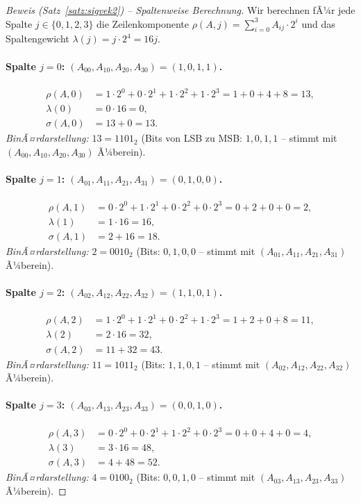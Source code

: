 ﻿\documentclass[a4paper,12pt]{scrreprt}
\theoremstyle{definition}
\begin{document}
\begin{proof}[Beweis (Satz~\ref{satz:sigvek2}) -- Spaltenweise Berechnung]
Wir berechnen fÃ¼r jede Spalte $j \in \{0,1,2,3\}$ die Zeilenkomponente $\rho(A,j) = \sum_{i=0}^{3} A_{ij} \cdot 2^i$ und das Spaltengewicht $\lambda(j) = j \cdot 2^4 = 16j$.

\paragraph{Spalte $j=0$: $(A_{00}, A_{10}, A_{20}, A_{30}) = (1, 0, 1, 1)$.}
\begin{align*}
\rho(A,0) &= 1 \cdot 2^0 + 0 \cdot 2^1 + 1 \cdot 2^2 + 1 \cdot 2^3 = 1 + 0 + 4 + 8 = 13, \\
\lambda(0) &= 0 \cdot 16 = 0, \\
\sigma(A,0) &= 13 + 0 = 13.
\end{align*}
\emph{BinÃ¤rdarstellung:} $13 = 1101_2$ (Bits von LSB zu MSB: $1, 0, 1, 1$ -- stimmt mit $(A_{00}, A_{10}, A_{20}, A_{30})$ Ã¼berein). \checkmark

\paragraph{Spalte $j=1$: $(A_{01}, A_{11}, A_{21}, A_{31}) = (0, 1, 0, 0)$.}
\begin{align*}
\rho(A,1) &= 0 \cdot 2^0 + 1 \cdot 2^1 + 0 \cdot 2^2 + 0 \cdot 2^3 = 0 + 2 + 0 + 0 = 2, \\
\lambda(1) &= 1 \cdot 16 = 16, \\
\sigma(A,1) &= 2 + 16 = 18.
\end{align*}
\emph{BinÃ¤rdarstellung:} $2 = 0010_2$ (Bits: $0, 1, 0, 0$ -- stimmt mit $(A_{01}, A_{11}, A_{21}, A_{31})$ Ã¼berein). \checkmark

\paragraph{Spalte $j=2$: $(A_{02}, A_{12}, A_{22}, A_{32}) = (1, 1, 0, 1)$.}
\begin{align*}
\rho(A,2) &= 1 \cdot 2^0 + 1 \cdot 2^1 + 0 \cdot 2^2 + 1 \cdot 2^3 = 1 + 2 + 0 + 8 = 11, \\
\lambda(2) &= 2 \cdot 16 = 32, \\
\sigma(A,2) &= 11 + 32 = 43.
\end{align*}
\emph{BinÃ¤rdarstellung:} $11 = 1011_2$ (Bits: $1, 1, 0, 1$ -- stimmt mit $(A_{02}, A_{12}, A_{22}, A_{32})$ Ã¼berein). \checkmark

\paragraph{Spalte $j=3$: $(A_{03}, A_{13}, A_{23}, A_{33}) = (0, 0, 1, 0)$.}
\begin{align*}
\rho(A,3) &= 0 \cdot 2^0 + 0 \cdot 2^1 + 1 \cdot 2^2 + 0 \cdot 2^3 = 0 + 0 + 4 + 0 = 4, \\
\lambda(3) &= 3 \cdot 16 = 48, \\
\sigma(A,3) &= 4 + 48 = 52.
\end{align*}
\emph{BinÃ¤rdarstellung:} $4 = 0100_2$ (Bits: $0, 0, 1, 0$ -- stimmt mit $(A_{03}, A_{13}, A_{23}, A_{33})$ Ã¼berein). \checkmark


\end{proof}
\end{document}
